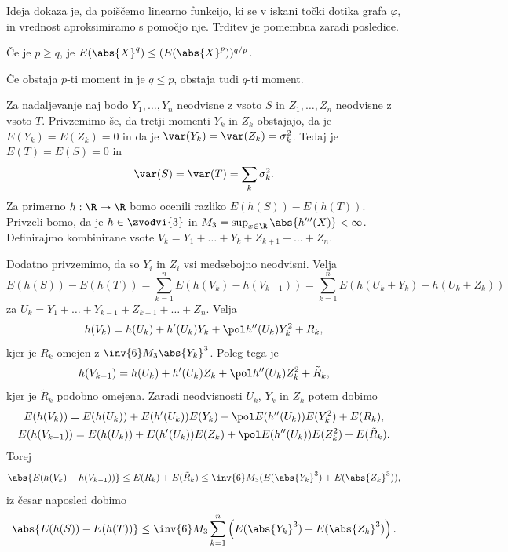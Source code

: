 Ideja dokaza je, da poiščemo linearno funkcijo, ki se v iskani točki dotika
grafa $\varphi$, in vrednost aproksimiramo s pomočjo nje.
Trditev je pomembna zaradi posledice.

\begin{posledica}
  Če je $p \ge q$, je $E(\abs{X}^q) \le (E(\abs{X}^p))^{q/p}$.
\end{posledica}

\begin{posledica}
  Če obstaja $p$-ti moment in je $q \le p$, obstaja tudi $q$-ti moment.
\end{posledica}

Za nadaljevanje naj bodo $Y_1, \ldots, Y_n$ neodvisne z vsoto $S$ in $Z_1,
\ldots, Z_n$ neodvisne z vsoto $T$.
Privzemimo še, da tretji momenti $Y_k$ in $Z_k$ obstajajo, da je $E(Y_k) =
E(Z_k) = 0$ in da je $\var(Y_k) = \var(Z_k) = \sigma_k^2$.
Tedaj je $E(T) = E(S) = 0$ in
\[
  \var(S) = \var(T) = \sum_{k} \sigma_k^2.
\]
Za primerno $h : \R \to \R$ bomo ocenili razliko $E(h(S)) - E(h(T))$.
Privzeli bomo, da je $h \in \zvodvi{3}$ in $M_3 = \sup_{x \in \R} \abs{h'''(X)}
< \infty$.
Definirajmo kombinirane vsote $V_k = Y_1 + \ldots + Y_k + Z_{k+1} + \ldots +
Z_n$.

Dodatno privzemimo, da so $Y_i$ in $Z_i$ vsi medsebojno neodvisni.
Velja
\[
  E(h(S)) - E(h(T)) = \sum_{k=1}^n E(h(V_k) - h(V_{k-1}))
  = \sum_{k=1}^n E(h(U_k + Y_k) - h(U_k + Z_k))
\]
za $U_k = Y_1 + \ldots + Y_{k-1} + Z_{k+1} + \ldots + Z_n$.
Velja
\[
  h(V_k) = h(U_k) + h'(U_k) Y_k + \pol h''(U_k) Y_k^2 + R_k,
\]
kjer je $R_k$ omejen z $\inv{6} M_3 \abs{Y_k}^3$.
Poleg tega je
\[
  h(V_{k-1}) = h(U_k) + h'(U_k) Z_k + \pol h''(U_k) Z_k^2 + \tilde{R}_k,
\]
kjer je $\tilde{R}_k$ podobno omejena.
Zaradi neodvisnosti $U_k$, $Y_k$ in $Z_k$ potem dobimo
\begin{gather*}
  E(h(V_k)) = E(h(U_k)) + E(h'(U_k)) E(Y_k) + \pol E(h''(U_k)) E(Y_k^2) + E(R_k),
  \\
  E(h(V_{k-1})) = E(h(U_k)) + E(h'(U_k)) E(Z_k) + \pol E(h''(U_k)) E(Z_k^2) + E(\tilde{R}_k).
\end{gather*}
Torej
\[
  \abs{E(h(V_k) - h(V_{k-1}))} \le E(R_k) + E(\tilde{R}_k) \le \inv{6} M_3
  (E(\abs{Y_k}^3) + E(\abs{Z_k}^3)),
\]
iz česar naposled dobimo
\[
  \abs{E(h(S)) - E(h(T))} \le \inv{6} M_3 \sum_{k=1}^n \left( E(\abs{Y_k}^3) +
	E(\abs{Z_k}^3) \right).
\]


